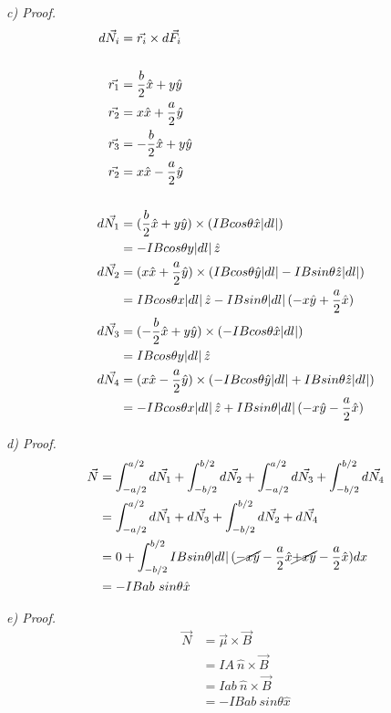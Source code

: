 \textit{c) Proof.}
\begin{align*}
    d\vec{N_i} &= \vec{r_i} \times d\vec{F_i} \\ \\
    \vec{r_1} &= \frac{b}{2} \hat{x} + y \hat{y} \\
    \vec{r_2} &= x \hat{x} + \frac{a}{2} \hat{y} \\
    \vec{r_3} &= - \frac{b}{2} \hat{x} + y \hat{y} \\
    \vec{r_2} &= x \hat{x} - \frac{a}{2} \hat{y} \\ \\
    d\vec{N_1} &= (\frac{b}{2} \hat{x} + y \hat{y}) \times (I B cos\theta \hat{x} \abs{dl}) \\ 
               &= -IBcos\theta y \abs{dl} \hat{z} \\
    d\vec{N_2} &= (x \hat{x} + \frac{a}{2} \hat{y}) \times (I B cos\theta \hat{y} \abs{dl} - I B sin\theta \hat{z} \abs{dl}) \\ 
               &= IBcos\theta x \abs{dl} \hat{z}  - IBsin\theta\abs{dl} (-x\hat{y} + \frac{a}{2}\hat{x}) \\
    d\vec{N_3} &= (- \frac{b}{2} \hat{x} + y \hat{y}) \times (- I B cos\theta \hat{x} \abs{dl}) \\ 
			   &= IBcos\theta y \abs{dl} \hat{z} \\
    d\vec{N_4} &= (x \hat{x} - \frac{a}{2} \hat{y}) \times (- I B cos\theta \hat{y} \abs{dl} + I B sin\theta \hat{z} \abs{dl}) \\ 
			   &= -IBcos\theta x \abs{dl} \hat{z}  + IBsin\theta\abs{dl} (-x\hat{y} - \frac{a}{2}\hat{x}) \\
\end{align*}

\textit{d) Proof.}
\begin{align*}
\vec{N} &= \int_{-a/2}^{a/2} d\vec{N_1} + \int_{-b/2}^{b/2} d\vec{N_2} 
         + \int_{-a/2}^{a/2}d\vec{N_3} + \int_{-b/2}^{b/2}d\vec{N_4} \\
        &= \int_{-a/2}^{a/2} d\vec{N_1} + d\vec{N_3} + \int_{-b/2}^{b/2} d\vec{N_2} + d\vec{N_4} \\
        &= 0 + \int_{-b/2}^{b/2} IBsin\theta\abs{dl} (\cancel{-x\hat{y}} - \frac{a}{2}\hat{x} \cancel{+ x\hat{y}} - \frac{a}{2}\hat{x}) dx \\
        &= -IB ab \ sin\theta \hat{x}
\end{align*}

\textit{e) Proof.}
\begin{align*}
\vec{N} &= \vec{\mu} \times \vec{B} \\
        &= I A \ \hat{n} \times \vec{B} \\
        &= I ab \ \hat{n} \times \vec{B} \\
        &= - I B ab \ sin\theta \hat{x}\\
\end{align*}


